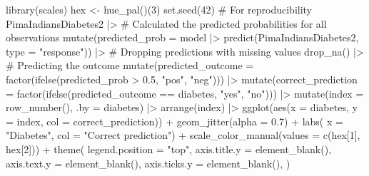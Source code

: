 \documentclass[
  letterpaper,
  DIV=11,
  numbers=noendperiod]{scrreprt}
\newenvironment{Shaded}{\begin{snugshade}}{\end{snugshade}}
\newcommand{\AttributeTok}[1]{\textcolor[rgb]{0.40,0.45,0.13}{#1}}
\newcommand{\CommentTok}[1]{\textcolor[rgb]{0.37,0.37,0.37}{#1}}
\newcommand{\DecValTok}[1]{\textcolor[rgb]{0.68,0.00,0.00}{#1}}
\newcommand{\FloatTok}[1]{\textcolor[rgb]{0.68,0.00,0.00}{#1}}
\newcommand{\FunctionTok}[1]{\textcolor[rgb]{0.28,0.35,0.67}{#1}}
\newcommand{\NormalTok}[1]{\textcolor[rgb]{0.00,0.23,0.31}{#1}}
\newcommand{\OtherTok}[1]{\textcolor[rgb]{0.00,0.23,0.31}{#1}}
\newcommand{\SpecialCharTok}[1]{\textcolor[rgb]{0.37,0.37,0.37}{#1}}
\newcommand{\StringTok}[1]{\textcolor[rgb]{0.13,0.47,0.30}{#1}}
\begin{document}
\begin{Shaded}
\begin{Highlighting}[]
\FunctionTok{library}\NormalTok{(scales)}
\NormalTok{hex }\OtherTok{\textless{}{-}} \FunctionTok{hue\_pal}\NormalTok{()(}\DecValTok{3}\NormalTok{)}
\FunctionTok{set.seed}\NormalTok{(}\DecValTok{42}\NormalTok{) }\CommentTok{\# For reproducibility}
\NormalTok{PimaIndiansDiabetes2 }\SpecialCharTok{|\textgreater{}} 
  \CommentTok{\# Calculated the predicted probabilities for all observations}
  \FunctionTok{mutate}\NormalTok{(}\AttributeTok{predicted\_prob =}\NormalTok{ model }\SpecialCharTok{|\textgreater{}} \FunctionTok{predict}\NormalTok{(PimaIndiansDiabetes2, }\AttributeTok{type =} \StringTok{"response"}\NormalTok{)) }\SpecialCharTok{|\textgreater{}} 
  \CommentTok{\# Dropping predictions with missing values}
  \FunctionTok{drop\_na}\NormalTok{() }\SpecialCharTok{|\textgreater{}} 
  \CommentTok{\# Predicting the outcome}
  \FunctionTok{mutate}\NormalTok{(}\AttributeTok{predicted\_outcome =} \FunctionTok{factor}\NormalTok{(}\FunctionTok{ifelse}\NormalTok{(predicted\_prob }\SpecialCharTok{\textgreater{}} \FloatTok{0.5}\NormalTok{, }\StringTok{"pos"}\NormalTok{, }\StringTok{"neg"}\NormalTok{))) }\SpecialCharTok{|\textgreater{}} 
  \FunctionTok{mutate}\NormalTok{(}\AttributeTok{correct\_prediction =} \FunctionTok{factor}\NormalTok{(}\FunctionTok{ifelse}\NormalTok{(predicted\_outcome }\SpecialCharTok{==}\NormalTok{ diabetes, }\StringTok{"yes"}\NormalTok{, }\StringTok{"no"}\NormalTok{))) }\SpecialCharTok{|\textgreater{}} 
  \FunctionTok{mutate}\NormalTok{(}\AttributeTok{index =} \FunctionTok{row\_number}\NormalTok{(), }\AttributeTok{.by =}\NormalTok{ diabetes) }\SpecialCharTok{|\textgreater{}} 
  \FunctionTok{arrange}\NormalTok{(index) }\SpecialCharTok{|\textgreater{}} 
  \FunctionTok{ggplot}\NormalTok{(}\FunctionTok{aes}\NormalTok{(}\AttributeTok{x =}\NormalTok{ diabetes, }\AttributeTok{y =}\NormalTok{ index, }\AttributeTok{col =}\NormalTok{ correct\_prediction)) }\SpecialCharTok{+}
  \FunctionTok{geom\_jitter}\NormalTok{(}\AttributeTok{alpha =} \FloatTok{0.7}\NormalTok{) }\SpecialCharTok{+}
  \FunctionTok{labs}\NormalTok{(}
    \AttributeTok{x =} \StringTok{"Diabetes"}\NormalTok{,}
    \AttributeTok{col =} \StringTok{"Correct prediction"}\NormalTok{) }\SpecialCharTok{+}
  \FunctionTok{scale\_color\_manual}\NormalTok{(}\AttributeTok{values =} \FunctionTok{c}\NormalTok{(hex[}\DecValTok{1}\NormalTok{], hex[}\DecValTok{2}\NormalTok{])) }\SpecialCharTok{+}
  \FunctionTok{theme}\NormalTok{(}
    \AttributeTok{legend.position =} \StringTok{"top"}\NormalTok{,}
    \AttributeTok{axis.title.y =} \FunctionTok{element\_blank}\NormalTok{(),}
    \AttributeTok{axis.text.y =} \FunctionTok{element\_blank}\NormalTok{(),}
    \AttributeTok{axis.ticks.y =} \FunctionTok{element\_blank}\NormalTok{(),}
\NormalTok{    )}
\end{Highlighting}
\end{Shaded}
\end{document}
